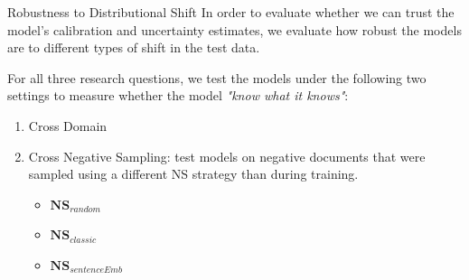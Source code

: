 \documentclass{beamer}
\begin{document}
\begin{frame}{Robustness to Distributional Shift}
In order to evaluate whether we can trust the model’s calibration and uncertainty estimates, we evaluate how robust the models are to different types of shift in the test data.

For all three research questions, we test the models under the following two settings to measure whether the model \textsl{"know what it knows"}:
\begin{enumerate}
    \item Cross Domain
    \item Cross Negative Sampling: test models on negative documents that were sampled using a different NS strategy than during training.
        \begin{itemize}
            \item $\textbf{NS}_{random}$
            \item $\textbf{NS}_{classic}$
            \item $\textbf{NS}_{sentenceEmb}$
        \end{itemize}
        
\end{enumerate}
    
\end{frame}
\end{document}

